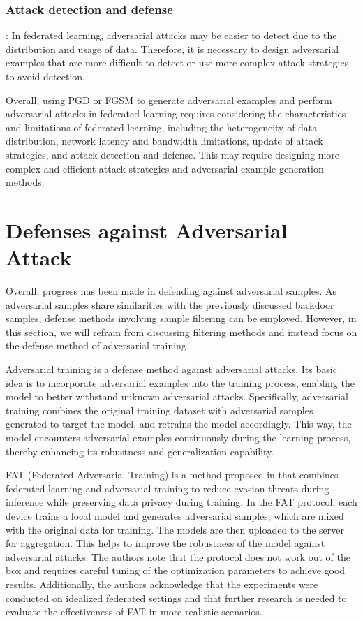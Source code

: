 \documentclass[conference]{IEEEtran}
\begin{document}
\subsubsection{Attack detection and defense}: In federated learning, adversarial
attacks may be easier to detect due to the distribution and usage
of data. Therefore, it is necessary to design adversarial examples
that are more difficult to detect or use more complex attack strategies
to avoid detection.

Overall, using PGD or FGSM to generate adversarial examples and perform
adversarial attacks in federated learning requires considering the
characteristics and limitations of federated learning, including
the heterogeneity of data distribution, network latency and bandwidth
limitations, update of attack strategies, and attack detection and defense.
This may require designing more complex and efficient attack strategies
and adversarial example generation methods.


\section{Defenses against Adversarial Attack}

Overall, progress has been made in defending against adversarial samples.
As adversarial samples share similarities with the previously discussed backdoor
samples, defense methods involving sample filtering can be employed.
However, in this section, we will refrain from discussing filtering methods
and instead focus on the defense method of adversarial training.

Adversarial training is a defense method against adversarial attacks.
Its basic idea is to incorporate adversarial examples into the training process,
enabling the model to better withstand unknown adversarial attacks.
Specifically, adversarial training combines the original training dataset
with adversarial samples generated to target the model, and retrains the
model accordingly. This way, the model encounters adversarial examples
continuously during the learning process, thereby enhancing its robustness
and generalization capability.

FAT (Federated Adversarial Training) is a method proposed in \cite{b31} that
combines federated learning and adversarial training to reduce evasion
threats during inference while preserving data privacy during training.
In the FAT protocol, each device trains a local model and generates adversarial
samples, which are mixed with the original data for training.
The models are then uploaded to the server for aggregation.
This helps to improve the robustness of the model against adversarial attacks.
The authors note that the protocol does not work out of the box and requires careful
tuning of the optimization parameters to achieve good results. Additionally, the authors
acknowledge that the experiments were conducted on idealized federated settings and that
further research is needed to evaluate the effectiveness of FAT in more realistic scenarios.
\end{document}
